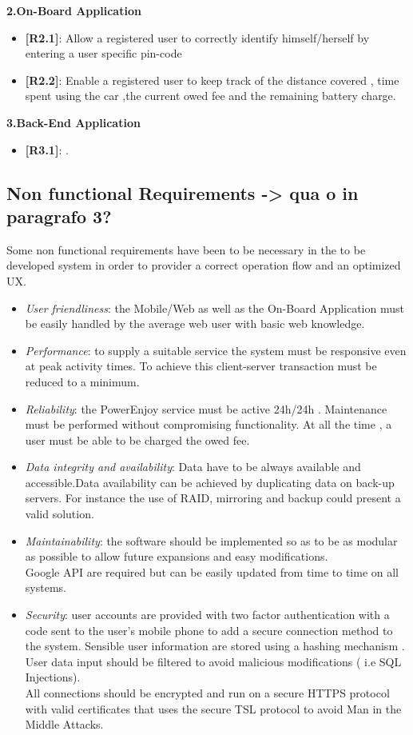 \documentclass[12pt]{article}
\begin{document}
	\textbf{2.On-Board Application}
	\begin{itemize}
	 \item{\textbf{[R2.1]}}: Allow a registered user to correctly identify himself/herself by entering a user specific pin-code
 	 \item{\textbf{[R2.2]}}: Enable a registered user to keep track of the distance covered , time spent using the car ,the current owed fee and the remaining battery charge.
 	 \end{itemize}
 	 
 	 \textbf{3.Back-End Application}
	\begin{itemize}
	 \item{\textbf{[R3.1]}}: .
 	 \end{itemize}
	
	\subsection{Non functional Requirements -> qua o in paragrafo 3?} 
		Some non functional requirements have been to be necessary in the to be developed system in order to provider a correct operation flow and an optimized UX.
		\begin{itemize}
			\item \textit{User friendliness}: the Mobile/Web as well as the On-Board Application must be easily handled by the average web user with basic web knowledge.
			\item \textit{Performance}: to supply a suitable service the system must be responsive even at peak activity times. To achieve this client-server transaction must be reduced to a minimum.
		 	\item \textit{Reliability}: the PowerEnjoy service must be active 24h/24h . Maintenance must be performed without compromising functionality. At all the time , a user must be able to be charged the owed fee.	
		 	\item \textit{Data integrity and availability}: 
		 	Data have to be always available and accessible.Data availability can be achieved by duplicating data on back-up servers. For instance the use of RAID, mirroring and backup could present a valid solution.

		 	\item \textit{Maintainability}: the software should be implemented so as to be as modular as possible to allow future expansions and easy modifications.\\Google API are required but can be easily updated from time to time on all systems.
		 	\item \textit{Security}: user accounts are provided with two factor authentication with a code sent to the user's mobile phone to add a secure connection method to the system. Sensible user information are stored using a hashing mechanism .\\User data input should be filtered to avoid malicious modifications ( i.e SQL Injections). \\All connections should be encrypted and run on a secure HTTPS protocol with valid certificates that uses the secure TSL protocol to avoid Man in the Middle Attacks.
		\end{itemize}
		
\end{document}
